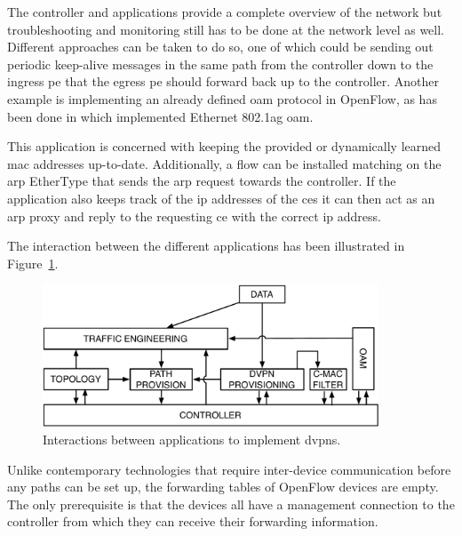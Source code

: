 \begin{description}[leftmargin=!,labelwidth=\widthof{\bfseries Topology Discovery}]
	\item[\acs{oam}] The controller and applications provide a complete overview of the network but troubleshooting and monitoring still has to be done at the network level as well. Different approaches can be taken to do so, one of which could be sending out periodic keep-alive messages in the same path from the controller down to the ingress \ac{pe} that the egress \ac{pe} should forward back up to the controller. Another example is implementing an already defined \ac{oam} protocol in OpenFlow, as has been done in \cite{of-oam} which implemented Ethernet 802.1ag \ac{oam}.
	
	\item[\ac{cmac} Filtering] This application is concerned with keeping the provided or dynamically learned \ac{mac} addresses up-to-date. Additionally, a flow can be installed matching on the \ac{arp} EtherType that sends the \ac{arp} request towards the controller. If the application also keeps track of the \ac{ip} addresses of the \acp{ce} it can then act as an \ac{arp} proxy and reply to the requesting \ac{ce} with the correct \ac{ip} address.
\end{description}

The interaction between the different applications has been illustrated in Figure~\ref{fig:dvpn-apps}.

\begin{figure}[h]
	\centering
	\includegraphics[width=10cm]{./includes/dvpn-apps.pdf}
	\caption{Interactions between applications to implement \acp{dvpn}.}
	\label{fig:dvpn-apps}
\end{figure}

Unlike contemporary technologies that require inter-device communication before any paths can be set up, the forwarding tables of OpenFlow devices are empty. The only prerequisite is that the devices all have a management connection to the controller from which they can receive their forwarding information.




